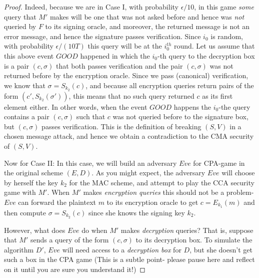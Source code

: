 \begin{proof}
Indeed, because we are in Case I, with probability \(\epsilon/10\), in
this game \emph{some} query that \(M'\) makes will be one that was not
asked before and hence was \emph{not} queried by \(F\) to its signing
oracle, and moreover, the returned message is not an error message, and
hence the signature passes verification. Since \(i_0\) is random, with
probability \(\epsilon/(10T)\) this query will be at the \(i_0^{th}\)
round. Let us assume that this above event
\(\ensuremath{\mathit{GOOD}}\) happened in which the \(i_0\)-th query to
the decryption box is a pair \((c,\sigma)\) that both passes
verification and the pair \((c,\sigma)\) was not returned before by the
encryption oracle. Since we pass (canonical) verification, we know that
\(\sigma=S_{k_2}(c)\), and because all encryption queries return pairs
of the form \((c',S_{k_2}(\sigma'))\), this means that no such query
returned \(c\) as its first element either. In other words, when the
event \(\ensuremath{\mathit{GOOD}}\) happens the \(i_0\)-the query
contains a pair \((c,\sigma)\) such that \(c\) was not queried before to
the signature box, but \((c,\sigma)\) passes verification. This is the
definition of breaking \((S,V)\) in a chosen message attack, and hence
we obtain a contradiction to the CMA security of \((S,V)\).

Now for Case II: In this case, we will build an adversary \(Eve\) for
CPA-game in the original scheme \((E,D)\). As you might expect, the
adversary \(Eve\) will choose by herself the key \(k_2\) for the MAC
scheme, and attempt to play the CCA security game with \(M'\). When
\(M'\) makes \emph{encryption queries} this should not be a problem-
\(Eve\) can forward the plaintext \(m\) to its encryption oracle to get
\(c=E_{k_1}(m)\) and then compute \(\sigma = S_{k_2}(c)\) since she
knows the signing key \(k_2\).

However, what does \(Eve\) do when \(M'\) makes \emph{decryption}
queries? That is, suppose that \(M'\) sends a query of the form
\((c,\sigma)\) to its decryption box. To simulate the algorithm \(D'\),
\(Eve\) will need access to a \emph{decryption box} for \(D\), but she
doesn't get such a box in the CPA game (This is a subtle point- please
pause here and reflect on it until you are sure you understand it!)


\end{proof}
